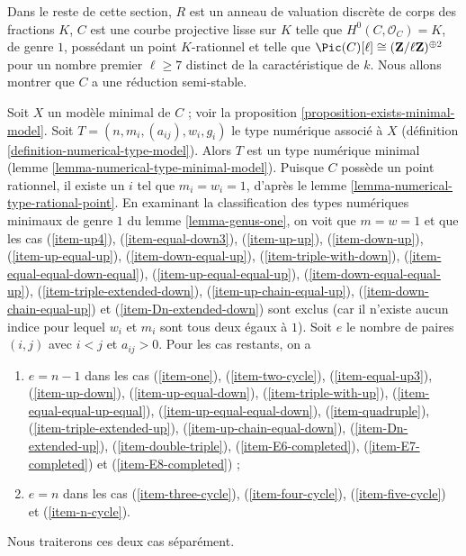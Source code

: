 \medskip\noindent
Dans le reste de cette section, $R$ est un anneau de valuation discrète de
corps des fractions $K$, $C$ est une courbe projective lisse sur $K$ telle
que $H^0(C,\mathcal{O}_C)=K$, de genre $1$, possédant un point
$K$-rationnel et telle que
$\Pic(C)[\ell]\cong(\mathbf{Z}/\ell\mathbf{Z})^{\oplus2}$ pour un nombre
premier $\ell\geq7$ distinct de la caractéristique de $k$. Nous allons
montrer que $C$ a une réduction semi-stable.

\medskip\noindent
Soit $X$ un modèle minimal de $C$ ; voir la proposition
\ref{proposition-exists-minimal-model}. Soit
$T=(n, m_i, (a_{ij}), w_i, g_i)$ le type numérique associé à $X$
(définition \ref{definition-numerical-type-model}). Alors $T$ est un type
numérique minimal (lemme \ref{lemma-numerical-type-minimal-model}).
Puisque $C$ possède un point rationnel, il existe un $i$ tel que
$m_i=w_i=1$, d'après le lemme
\ref{lemma-numerical-type-rational-point}. En examinant la classification
des types numériques minimaux de genre $1$ du lemme
\ref{lemma-genus-one}, on voit que $m=w=1$ et que les cas
(\ref{item-up4}),
(\ref{item-equal-down3}),
(\ref{item-up-up}),
(\ref{item-down-up}),
(\ref{item-up-equal-up}),
(\ref{item-down-equal-up}),
(\ref{item-triple-with-down}),
(\ref{item-equal-equal-down-equal}),
(\ref{item-up-equal-equal-up}),
(\ref{item-down-equal-equal-up}),
(\ref{item-triple-extended-down}),
(\ref{item-up-chain-equal-up}),
(\ref{item-down-chain-equal-up}) et
(\ref{item-Dn-extended-down}) sont exclus (car il n'existe aucun indice
pour lequel $w_i$ et $m_i$ sont tous deux égaux à $1$). Soit $e$ le nombre de paires $(i,j)$
avec $i<j$ et $a_{ij}>0$. Pour les cas restants, on a
\begin{enumerate}
\item[(A)] $e=n-1$ dans les cas
(\ref{item-one}),
(\ref{item-two-cycle}),
(\ref{item-equal-up3}),
(\ref{item-up-down}),
(\ref{item-up-equal-down}),
(\ref{item-triple-with-up}),
(\ref{item-equal-equal-up-equal}),
(\ref{item-up-equal-equal-down}),
(\ref{item-quadruple}),
(\ref{item-triple-extended-up}),
(\ref{item-up-chain-equal-down}),
(\ref{item-Dn-extended-up}),
(\ref{item-double-triple}),
(\ref{item-E6-completed}),
(\ref{item-E7-completed}) et
(\ref{item-E8-completed}) ;
\item[(B)] $e=n$ dans les cas
(\ref{item-three-cycle}),
(\ref{item-four-cycle}),
(\ref{item-five-cycle}) et
(\ref{item-n-cycle}).
\end{enumerate}
Nous traiterons ces deux cas séparément.

